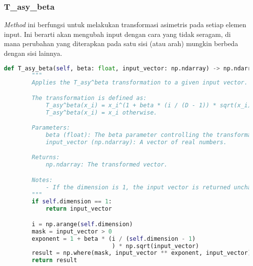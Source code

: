 \subsubsection{T\_asy\_beta}
\textit{Method} ini berfungsi untuk melakukan transformasi asimetris pada setiap elemen input. Ini berarti akan mengubah input dengan cara yang tidak seragam, di mana perubahan yang diterapkan pada satu sisi (atau arah) mungkin berbeda dengan sisi lainnya.
\begin{lstlisting}[language=Python, caption=\textit{method} untuk menerapkan transformasi asimetris pada elemen input, label=lst:init_cec]
    def T_asy_beta(self, beta: float, input_vector: np.ndarray) -> np.ndarray:
        """
        Applies the T_asy^beta transformation to a given input vector.

        The transformation is defined as:
            T_asy^beta(x_i) = x_i^(1 + beta * (i / (D - 1)) * sqrt(x_i)) if x_i > 0,
            T_asy^beta(x_i) = x_i otherwise.

        Parameters:
            beta (float): The beta parameter controlling the transformation.
            input_vector (np.ndarray): A vector of real numbers.

        Returns:
            np.ndarray: The transformed vector.

        Notes:
            - If the dimension is 1, the input vector is returned unchanged.
        """
        if self.dimension == 1:
            return input_vector

        i = np.arange(self.dimension)
        mask = input_vector > 0
        exponent = 1 + beta * (i / (self.dimension - 1)
                               ) * np.sqrt(input_vector)
        result = np.where(mask, input_vector ** exponent, input_vector)
        return result
\end{lstlisting}
